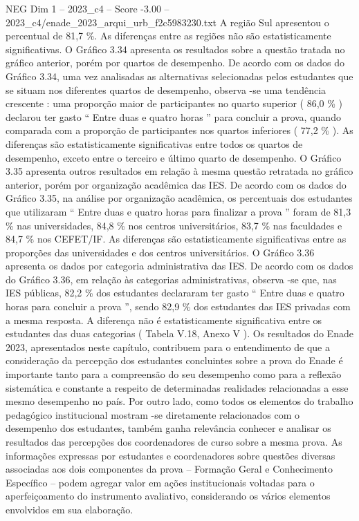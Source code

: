 \begin{textsample}{NEG Dim 1 – 2023\_c4 – Score -3.00 – 2023\_c4/enade\_2023\_arqui\_urb\_f2c5983230.txt}
A região Sul apresentou o percentual de 81,7 \%.
As diferenças entre as regiões não são estatisticamente significativas.
O Gráfico 3.34 apresenta os resultados sobre a questão tratada no gráfico anterior, porém por quartos de desempenho.
De acordo com os dados do Gráfico 3.34, uma vez analisadas as alternativas selecionadas pelos estudantes que se situam nos diferentes quartos de desempenho, observa -se uma tendência crescente : uma proporção maior de participantes no quarto superior ( 86,0 \% ) declarou ter gasto “ Entre duas e quatro horas ” para concluir a prova, quando comparada com a proporção de participantes nos quartos inferiores ( 77,2 \% ).
As diferenças são estatisticamente significativas entre todos os quartos de desempenho, exceto entre o terceiro e último quarto de desempenho.
O Gráfico 3.35 apresenta outros resultados em relação à mesma questão retratada no gráfico anterior, porém por organização acadêmica das IES.
De acordo com os dados do Gráfico 3.35, na análise por organização acadêmica, os percentuais dos estudantes que utilizaram “ Entre duas e quatro horas para finalizar a prova ” foram de 81,3 \% nas universidades, 84,8 \% nos centros universitários, 83,7 \% nas faculdades e 84,7 \% nos CEFET/IF.
As diferenças são estatisticamente significativas entre as proporções das universidades e dos centros universitários.
O Gráfico 3.36 apresenta os dados por categoria administrativa das IES.
De acordo com os dados do Gráfico 3.36, em relação às categorias administrativas, observa -se que, nas IES públicas, 82,2 \% dos estudantes declararam ter gasto “ Entre duas e quatro horas para concluir a prova ”, sendo 82,9 \% dos estudantes das IES privadas com a mesma resposta.
A diferença não é estatisticamente significativa entre os estudantes das duas categorias ( Tabela V.18, Anexo V ).
Os resultados do Enade 2023, apresentados neste capítulo, contribuem para o entendimento de que a consideração da percepção dos estudantes concluintes sobre a prova do Enade é importante tanto para a compreensão do seu desempenho como para a reflexão sistemática e constante a respeito de determinadas realidades relacionadas a esse mesmo desempenho no país.
Por outro lado, como todos os elementos do trabalho pedagógico institucional mostram -se diretamente relacionados com o desempenho dos estudantes, também ganha relevância conhecer e analisar os resultados das percepções dos coordenadores de curso sobre a mesma prova.
As informações expressas por estudantes e coordenadores sobre questões diversas associadas aos dois componentes da prova – Formação Geral e Conhecimento Específico – podem agregar valor em ações institucionais voltadas para o aperfeiçoamento do instrumento avaliativo, considerando os vários elementos envolvidos em sua elaboração.

\end{textsample}
